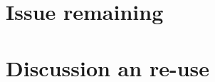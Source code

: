 \documentclass[12pt]{article}
\begin{document}
\clearpage

\section{Issue remaining}


\section{Discussion an re-use}
\end{document}
